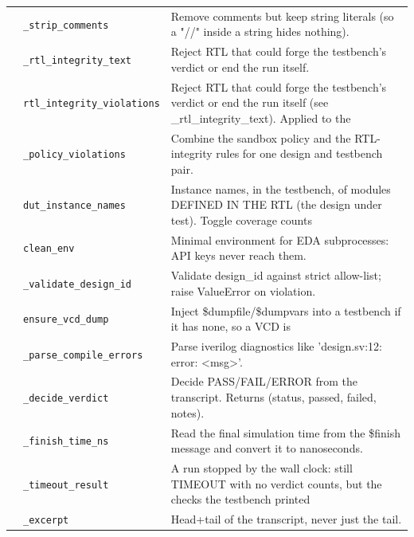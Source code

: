 \begin{longtable}{@{}p{2.8cm}>{\raggedright\arraybackslash}p{4.6cm}p{7.9cm}@{}}
{\small } & \texttt{\small \_\allowbreak{}strip\_\allowbreak{}comments} & Remove comments but keep string literals (so a "//" inside a string hides nothing). \\
{\small } & \texttt{\small \_\allowbreak{}rtl\_\allowbreak{}integrity\_\allowbreak{}text} & Reject RTL that could forge the testbench's verdict or end the run itself. \\
{\small } & \texttt{\small rtl\_\allowbreak{}integrity\_\allowbreak{}violations} & Reject RTL that could forge the testbench's verdict or end the run itself (see \_rtl\_integrity\_text). Applied to the \\
{\small } & \texttt{\small \_\allowbreak{}policy\_\allowbreak{}violations} & Combine the sandbox policy and the RTL-integrity rules for one design and testbench pair. \\
{\small } & \texttt{\small dut\_\allowbreak{}instance\_\allowbreak{}names} & Instance names, in the testbench, of modules DEFINED IN THE RTL (the design under test). Toggle coverage counts \\
{\small } & \texttt{\small clean\_\allowbreak{}env} & Minimal environment for EDA subprocesses: API keys never reach them. \\
{\small } & \texttt{\small \_\allowbreak{}validate\_\allowbreak{}design\_\allowbreak{}id} & Validate design\_id against strict allow-list; raise ValueError on violation. \\
{\small } & \texttt{\small ensure\_\allowbreak{}vcd\_\allowbreak{}dump} & Inject \$dumpfile/\$dumpvars into a testbench if it has none, so a VCD is \\
{\small } & \texttt{\small \_\allowbreak{}parse\_\allowbreak{}compile\_\allowbreak{}errors} & Parse iverilog diagnostics like 'design.sv:12: error: \textless{}msg\textgreater{}'. \\
{\small } & \texttt{\small \_\allowbreak{}decide\_\allowbreak{}verdict} & Decide PASS/FAIL/ERROR from the transcript. Returns (status, passed, failed, notes). \\
{\small } & \texttt{\small \_\allowbreak{}finish\_\allowbreak{}time\_\allowbreak{}ns} & Read the final simulation time from the \$finish message and convert it to nanoseconds. \\
{\small } & \texttt{\small \_\allowbreak{}timeout\_\allowbreak{}result} & A run stopped by the wall clock: still TIMEOUT with no verdict counts, but the checks the testbench printed \\
{\small } & \texttt{\small \_\allowbreak{}excerpt} & Head+tail of the transcript, never just the tail. \\

\end{longtable}
